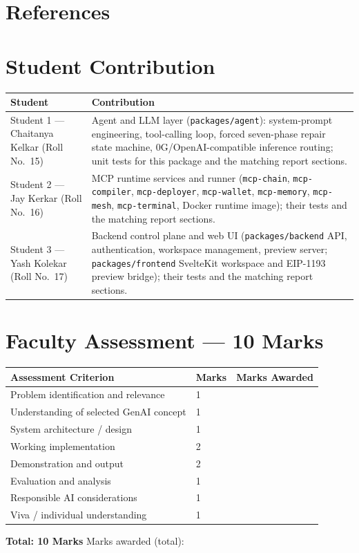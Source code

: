 \documentclass[11pt,letterpaper]{article}
\begin{document}
\section{References}
\printbibliography[heading=none]

\section{Student Contribution}
\begin{tabular}{|L{2.7in}|L{3.45in}|}
\hline
\textbf{Student} & \textbf{Contribution}\\\hline
Student 1 --- Chaitanya Kelkar (Roll No.\ 15) & Agent and LLM layer (\texttt{packages/agent}): system-prompt engineering, tool-calling loop, forced seven-phase repair state machine, 0G/OpenAI-compatible inference routing; unit tests for this package and the matching report sections.\\\hline
Student 2 --- Jay Kerkar (Roll No.\ 16) & MCP runtime services and runner (\texttt{mcp-chain}, \texttt{mcp-compiler}, \texttt{mcp-deployer}, \texttt{mcp-wallet}, \texttt{mcp-memory}, \texttt{mcp-mesh}, \texttt{mcp-terminal}, Docker runtime image); their tests and the matching report sections.\\\hline
Student 3 --- Yash Kolekar (Roll No.\ 17) & Backend control plane and web UI (\texttt{packages/backend} API, authentication, workspace management, preview server; \texttt{packages/frontend} SvelteKit workspace and EIP-1193 preview bridge); their tests and the matching report sections.\\\hline
\end{tabular}

\section{Faculty Assessment --- 10 Marks}
\begin{tabular}{|L{3.2in}|L{1.1in}|L{1.4in}|}
\hline
\textbf{Assessment Criterion} & \textbf{Marks} & \textbf{Marks Awarded}\\\hline
Problem identification and relevance & 1 & \\\hline
Understanding of selected GenAI concept & 1 & \\\hline
System architecture / design & 1 & \\\hline
Working implementation & 2 & \\\hline
Demonstration and output & 2 & \\\hline
Evaluation and analysis & 1 & \\\hline
Responsible AI considerations & 1 & \\\hline
Viva / individual understanding & 1 & \\\hline
\end{tabular}

\smallskip
\textbf{Total: 10 Marks} \hfill Marks awarded (total): \underline{\hspace{1.2in}}
\end{document}
